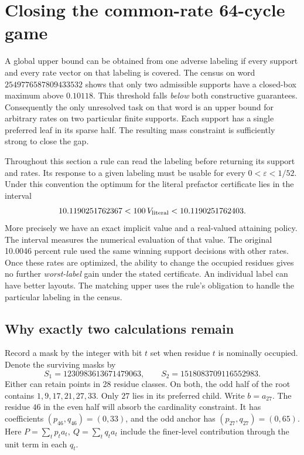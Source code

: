 \section{Closing the common-rate 64-cycle game}
\label{sec:cycle64-endgame}

A global upper bound can be obtained from one adverse labeling if every support and every rate vector on that labeling is covered. The census on word \(2549776587809433532\) shows that only two admissible supports have a closed-box maximum above \(0.10118\). This threshold falls \emph{below} both constructive guarantees. Consequently the only unresolved task on that word is an upper bound for arbitrary rates on two particular finite supports. Each support has a single preferred leaf in its sparse half. The resulting mass constraint is sufficiently strong to close the gap.

Throughout this section a rule can read the labeling before returning its support and rates. Its response to a given labeling must be usable for every \(0<\varepsilon<1/52\). Under this convention the optimum for the literal prefactor certificate lies in the interval
\[
 10.1190251762367
 <100\,V_{\rm literal}<
 10.1190251762403 .
\]
More precisely we have an exact implicit value and a real-valued attaining policy. The interval measures the numerical evaluation of that value. The original 10.0046 percent rule used the same winning support decisions with other rates. Once these rates are optimized, the ability to change the occupied residues gives no further \emph{worst-label} gain under the stated certificate. An individual label can have better layouts. The matching upper uses the rule's obligation to handle the particular labeling in the census.

\subsection{Why exactly two calculations remain}

Record a mask by the integer with bit \(t\) set when residue \(t\) is nominally occupied. Denote the surviving masks by
\[
 S_1=1230983613671479063,\qquad S_2=1518083709116552983 .
\]
Either can retain points in 28 residue classes. On both, the odd half of the root contains \(1,9,17,21,27,33\). Only \(27\) lies in its preferred child. Write \(b=a_{27}\). The residue \(46\) in the even half will absorb the cardinality constraint. It has coefficients \((p_{46},q_{46})=(0,33)\), and the odd anchor has \((p_{27},q_{27})=(0,65)\). Here \(P=\sum_t p_t a_t,\ Q=\sum_t q_t a_t\) include the finer-level contribution through the unit term in each \(q_t\).

